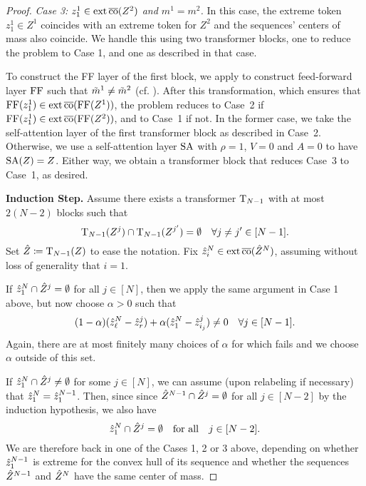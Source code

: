 \documentclass[11pt,a4paper]{amsart}
\begin{document}
\begin{proof}
\textit{Case 3: $z_1^1 \in \operatorname{ext}\operatorname{\overline{co}} (Z^2)$ and $m^1 = m^2$.} 
In this case, the extreme token $z_1^1 \in Z^1$ coincides with an extreme token for $Z^2$ and the sequences' centers of mass also coincide. We handle this using two transformer blocks, one to reduce the problem to Case 1, and one as described in that case.

To construct the FF layer of the first block, we apply  to construct feed-forward layer $\operatorname{\mathrm{FF}}$ such that $\Tilde{m}^1 \neq \Tilde{m}^2$ (cf. ). After this transformation, which ensures that $\operatorname{\mathrm{FF}} (z_1^1) \in \operatorname{ext} \operatorname{\overline{co}} (\operatorname{\mathrm{FF}}(Z^1))$, the problem reduces to Case~2 if $\operatorname{\mathrm{FF}} (z_1^1) \in \operatorname{ext} \operatorname{\overline{co}} (\operatorname{\mathrm{FF}} (Z^2))$, and to Case~1 if not. In the former case, we take the self-attention layer of the first transformer block as described in Case~2. Otherwise, we use a self-attention layer $\operatorname{\mathrm{SA}}$ with $\rho = 1$, $V = 0$ and $A=0$ to have $\operatorname{\mathrm{SA}}(Z) = Z$. Either way, we obtain a transformer block that reduces Case~3 to Case~1, as desired. 
\vspace{3mm}

\noindent\textbf{Induction Step.} Assume there exists a transformer $\operatorname{\mathrm{T}}_{N-1}$ with at most $2(N-2)$ blocks such that 
\begin{equation}
    \operatorname{\mathrm{T}}_{N-1}(Z^j) \cap \operatorname{\mathrm{T}}_{N-1}(Z^{j'}) = \emptyset \quad \forall j\neq j'\in [N-1].
\end{equation}
Set $\Hat{Z} \coloneqq \operatorname{\mathrm{T}}_{N-1}(Z)$ to ease the notation. Fix $\Hat{z}_i^N \in \operatorname{ext} \operatorname{\overline{co}} (\Hat{Z}^N)$, assuming without loss of generality that $i=1$.

If $\Hat{z}_1^N \cap \Hat{Z}^j = \emptyset$ for all $j\in [N]$, then we apply the same argument in Case 1 above, but now choose $\alpha > 0$ such that
\begin{equation}\label{eq:lemConditionOnAlphaInduction}
(1 - \alpha) (\Hat{z}_\ell^N - \Hat{z}_r^j) + \alpha (\Hat{z}_1^N - \Hat{z}_{i_j}^j) \neq 0 \quad \forall j\in [N-1]. 
\end{equation}
Again, there are at most finitely many choices of $\alpha$ for which  fails and we choose $\alpha$ outside of this set.
    
If $\Hat{z}_1^N \cap \Hat{Z}^j \neq \emptyset$ for some $j\in [N]$, we can assume (upon relabeling if necessary) that $\Hat{z}_1^N = \Hat{z}_1^{N-1}$. Then, since since $\hat{Z}^{N-1} \cap \Hat{Z}^j = \emptyset$ for all $j\in [N-2]$ by the induction hypothesis, we also have
\begin{equation}
    \Hat{z}_1^N \cap \Hat{Z}^j = \emptyset \quad \text{for all} \quad j\in [N-2].
\end{equation}
We are therefore back in one of the Cases 1, 2 or 3 above, depending on whether $\Hat{z}_1^{N-1}$ is extreme for the convex hull of its sequence and whether the sequences $\Hat{Z}^{N-1}$ and $\Hat{Z}^N$ have the same center of mass.


\end{proof}
\end{document}
